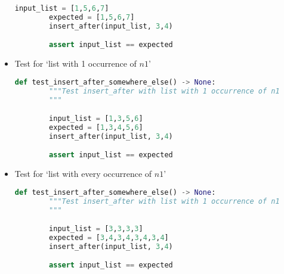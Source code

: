 \documentclass[12pt]{article}
\begin{document}
\begin{itemize}
\begin{lstlisting}[language=Python]
        input_list = [1,5,6,7]
        expected = [1,5,6,7]
        insert_after(input_list, 3,4)

        assert input_list == expected
    \end{lstlisting}

    \item

    Test for `list with 1 occurrence of $n1$'

    \begin{lstlisting}[language=Python]
    def test_insert_after_somewhere_else() -> None:
        """Test insert_after with list with 1 occurrence of n1
        """

        input_list = [1,3,5,6]
        expected = [1,3,4,5,6]
        insert_after(input_list, 3,4)

        assert input_list == expected
    \end{lstlisting}

    \item

    Test for `list with every occurrence of $n1$'

    \begin{lstlisting}[language=Python]
    def test_insert_after_somewhere_else() -> None:
        """Test insert_after with list with 1 occurrence of n1
        """

        input_list = [3,3,3,3]
        expected = [3,4,3,4,3,4,3,4]
        insert_after(input_list, 3,4)

        assert input_list == expected
    \end{lstlisting}
\end{itemize}
\end{document}
